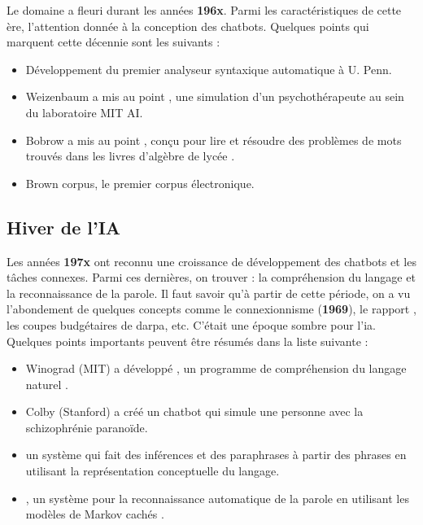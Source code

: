 \documentclass{KodeBook}
\begin{document}
Le domaine a fleuri durant les années \textbf{196x}.
Parmi les caractéristiques de cette ère, l'attention donnée à la conception des chatbots. 
Quelques points qui marquent cette décennie sont les suivants :
\begin{itemize}
	\item {} Développement du premier analyseur syntaxique automatique à U. Penn. \cite{1961-joshi,1962-harris} 
	\item {} Weizenbaum a mis au point , une simulation d'un psychothérapeute au sein du laboratoire MIT AI.
	\item {} Bobrow a mis au point , conçu pour lire et résoudre des problèmes de mots trouvés dans les livres d'algèbre de lycée \cite{1964-bobrow}.
	\item {} Brown corpus, le premier corpus électronique.
\end{itemize}

\subsection{Hiver de l'IA}

Les années \textbf{197x} ont reconnu une croissance de développement des chatbots et les tâches connexes. 
Parmi ces dernières, on trouver : la compréhension du langage et la reconnaissance  de la parole. 
Il faut savoir qu'à partir de cette période, on a vu l'abondement de quelques concepts comme le connexionnisme (\textbf{1969}), le rapport , les coupes budgétaires de \ac{darpa}, etc. 
C'était une époque sombre pour l'\ac{ia}.
Quelques points importants peuvent être résumés dans la liste suivante :
\begin{itemize}
	\item {} Winograd (MIT) a développé , un programme de compréhension du langage naturel \cite{1971-winograd}.
	\item {} Colby (Stanford) a créé  un chatbot qui simule une personne avec la schizophrénie paranoïde.
	\item {}  un système qui fait des inférences et des paraphrases à partir des phrases en utilisant la représentation conceptuelle du langage. 
	\item {} , un système pour la reconnaissance automatique de la parole en utilisant les modèles de Markov cachés \cite{1975-baker}.
\end{itemize}
\end{document}
